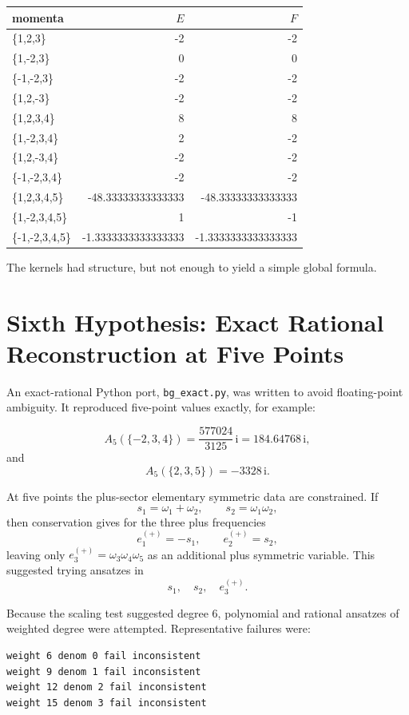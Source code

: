 \documentclass[11pt]{article}
\newcommand{\code}[1]{\texttt{#1}}
\newcommand{\ii}{\mathrm{i}}
\begin{document}
\begin{center}
\begin{tabular}{>{\ttfamily}l r r}
momenta & \(E\) & \(F\)\\
\hline
\{1,2,3\} & -2 & -2\\
\{1,-2,3\} & 0 & 0\\
\{-1,-2,3\} & -2 & -2\\
\{1,2,-3\} & -2 & -2\\
\{1,2,3,4\} & 8 & 8\\
\{1,-2,3,4\} & 2 & -2\\
\{1,2,-3,4\} & -2 & -2\\
\{-1,-2,3,4\} & -2 & -2\\
\{1,2,3,4,5\} & -48.33333333333333 & -48.33333333333333\\
\{1,-2,3,4,5\} & 1 & -1\\
\{-1,-2,3,4,5\} & -1.3333333333333333 & -1.3333333333333333
\end{tabular}
\end{center}

The kernels had structure, but not enough to yield a simple global formula.

\section{Sixth Hypothesis: Exact Rational Reconstruction at Five Points}

An exact-rational Python port, \code{bg\_exact.py}, was written to avoid
floating-point ambiguity.  It reproduced five-point values exactly, for
example:

\[
  A_5(\{-2,3,4\}) = \frac{577024}{3125}\,\ii
  = 184.64768\,\ii,
\]
and
\[
  A_5(\{2,3,5\}) = -3328\,\ii.
\]

At five points the plus-sector elementary symmetric data are constrained.  If
\[
  s_1=\omega_1+\omega_2,\qquad s_2=\omega_1\omega_2,
\]
then conservation gives for the three plus frequencies
\[
  e_1^{(+)}=-s_1,\qquad e_2^{(+)}=s_2,
\]
leaving only \(e_3^{(+)}=\omega_3\omega_4\omega_5\) as an additional plus
symmetric variable.  This suggested trying ansatzes in
\[
  s_1,\quad s_2,\quad e_3^{(+)}.
\]

Because the scaling test suggested degree \(6\), polynomial and rational
ansatzes of weighted degree were attempted.  Representative failures were:

\begin{Verbatim}[fontsize=\small]
weight 6 denom 0 fail inconsistent
weight 9 denom 1 fail inconsistent
weight 12 denom 2 fail inconsistent
weight 15 denom 3 fail inconsistent
\end{Verbatim}
\end{document}
